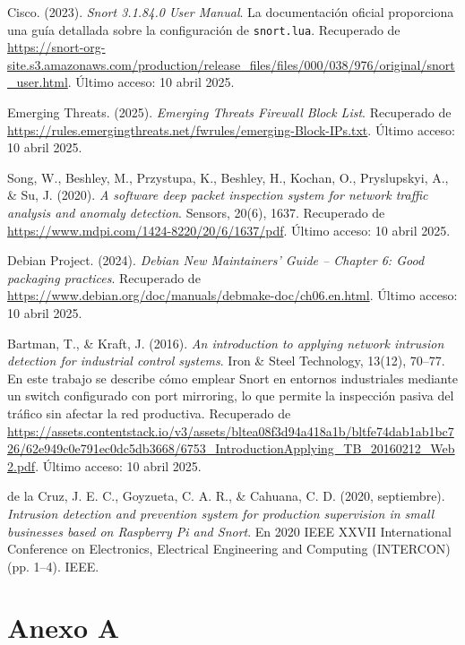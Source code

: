 \documentclass[11pt,a4paper,twoside]{report}
\begin{document}
\begin{thebibliography}{34}
	Cisco. (2023). \textit{Snort 3.1.84.0 User Manual}. La documentación oficial proporciona una guía detallada sobre la configuración de \texttt{snort.lua}. Recuperado de \url{https://snort-org-site.s3.amazonaws.com/production/release_files/files/000/038/976/original/snort_user.html}. Último acceso: 10 abril 2025.
	
	 Emerging Threats. (2025). \textit{Emerging Threats Firewall Block List}. Recuperado de \url{https://rules.emergingthreats.net/fwrules/emerging-Block-IPs.txt}. Último acceso: 10 abril 2025.
	
	Song, W., Beshley, M., Przystupa, K., Beshley, H., Kochan, O., Pryslupskyi, A., \& Su, J. (2020). \textit{A software deep packet inspection system for network traffic analysis and anomaly detection}. Sensors, 20(6), 1637. Recuperado de \url{https://www.mdpi.com/1424-8220/20/6/1637/pdf}. Último acceso: 10 abril 2025.
	
	Debian Project. (2024). \textit{Debian New Maintainers’ Guide – Chapter 6: Good packaging practices}. Recuperado de \url{https://www.debian.org/doc/manuals/debmake-doc/ch06.en.html}. Último acceso: 10 abril 2025.
	
	Bartman, T., \& Kraft, J. (2016). \textit{An introduction to applying network intrusion detection for industrial control systems}. Iron \& Steel Technology, 13(12), 70--77. En este trabajo se describe cómo emplear Snort en entornos industriales mediante un switch configurado con port mirroring, lo que permite la inspección pasiva del tráfico sin afectar la red productiva. Recuperado de \url{https://assets.contentstack.io/v3/assets/bltea08f3d94a418a1b/bltfe74dab1ab1bc726/62e949c0e791ec0dc5db3668/6753_IntroductionApplying_TB_20160212_Web2.pdf}. Último acceso: 10 abril 2025.
	
	de la Cruz, J. E. C., Goyzueta, C. A. R., \& Cahuana, C. D. (2020, septiembre). \textit{Intrusion detection and prevention system for production supervision in small businesses based on Raspberry Pi and Snort}. En 2020 IEEE XXVII International Conference on Electronics, Electrical Engineering and Computing (INTERCON) (pp. 1–4). IEEE.
	
\end{thebibliography}

\appendix
\chapter{Anexo A}
\label{anexo_repositorio}
\end{document}
